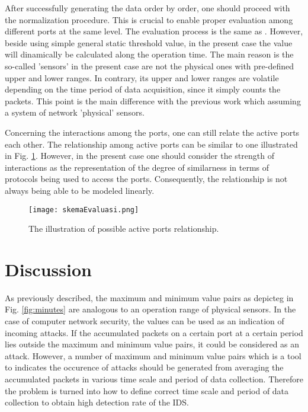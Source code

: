 \documentclass[conference,10pt,a4paper]{IEEEtran}
\begin{document}
After successfully generating the data order by order, one should proceed with the normalization procedure. This is crucial to enable proper evaluation among different ports at the same level. The evaluation process is the same as \cite{arya}. However, beside using simple general static threshold value, in the present case the value will dinamically be calculated along the operation time. The main reason is the so-called 'sensors' in the present case are not the physical ones with pre-defined upper and lower ranges. In contrary, its upper and lower ranges are volatile depending on the time period of data acquisition, since it simply counts the packets. This point is the main difference with the previous work which assuming a system of network 'physical' sensors.
 
Concerning the interactions among the ports, one can still relate the active ports each other. The relationship among active ports can be similar to one illustrated in Fig. \ref{fig:relation}. However, in the present case one should consider the strength of interactions as the representation of the degree of similarness in terms of protocols being used to access the ports. Consequently, the relationship is not always being able to be modeled linearly.

\begin{figure}[t!]
 \centering
 \texttt{[image: skemaEvaluasi.png]}
\caption{The illustration of possible active ports relationship.}
\label{fig:relation}
\end{figure}

\section{Discussion}

As previously described, the maximum and minimum value pairs as depicteg in Fig. \ref{fig:minutes} are  analogous to an operation range of physical sensors. In the case of computer network security, the values can be used as an indication of incoming attacks. If the accumulated packets on a certain port at a certain period lies outside the maximum and minimum value pairs, it could be considered as an attack. However, a number of maximum and minimum value pairs which is a tool to indicates the occurence of attacks should be generated from averaging the accumulated packets in various time scale and period of data collection. Therefore the problem is turned into how to define correct time scale and period of data collection to obtain high detection rate of the IDS.
\end{document}
